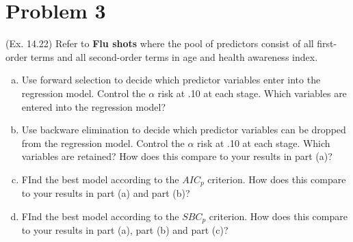 \documentclass[10pt]{report}
\begin{document}
\section*{Problem 3}
(Ex. 14.22) Refer to \textbf{Flu shots} where the pool of predictors consist of all first-order terms and all second-order terms in age and health awareness index.
\begin{enumerate}[a.]
	\item 
	Use forward selection to decide which predictor variables enter into the regression model. Control the $\alpha$ risk at .10 at each stage. Which variables are entered into the regression model?
	
	\item 
	Use backware elimination to decide which predictor variables can be dropped from the regression model. Control the $\alpha$ risk at .10 at each stage. Which variables are retained? How does this compare to your results in part (a)?
	
	\item 
	FInd the best model according to the $AIC_p$ criterion. How does this compare to your results in part (a) and part (b)?
	
	\item 
	FInd the best model according to the $SBC_p$ criterion. How does this compare to your results in part (a), part (b) and part (c)?
\end{enumerate}
\end{document}
